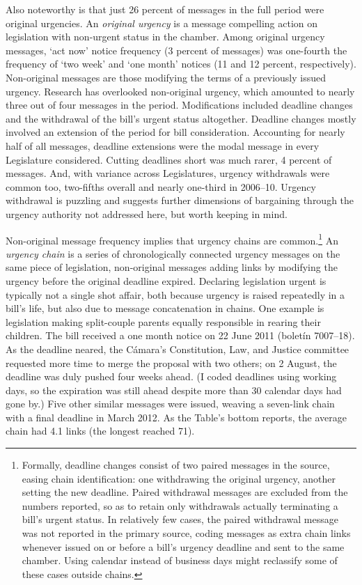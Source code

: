 \documentclass[letter,12pt]{article}
\begin{document}
Also noteworthy is that just 26 percent of messages in the full period were original urgencies. An \emph{original urgency} is a message compelling action on legislation with non-urgent status in the chamber. Among original urgency messages, `act now' notice frequency (3 percent of messages) was one-fourth the frequency of `two week' and `one month' notices (11 and 12 percent, respectively). Non-original messages are those modifying the terms of a previously issued urgency. Research has overlooked non-original urgency, which amounted to nearly three out of four messages in the period. Modifications included deadline changes and the withdrawal of the bill's urgent status altogether. Deadline changes mostly involved an extension of the period for bill consideration. Accounting for nearly half of all messages, deadline extensions were the modal message in every Legislature considered. Cutting deadlines short was much rarer, 4 percent of messages. And, with variance across Legislatures, urgency withdrawals were common too, two-fifths overall and nearly one-third in 2006--10. Urgency withdrawal is puzzling and suggests further dimensions of bargaining through the urgency authority not addressed here, but worth keeping in mind. 

Non-original message frequency implies that urgency chains are common.\footnote{Formally, deadline changes consist of two paired messages in the source, easing chain identification: one withdrawing the original urgency, another setting the new deadline. Paired withdrawal messages are excluded from the numbers reported, so as to retain only withdrawals actually terminating a bill's urgent status. In relatively few cases, the paired withdrawal message was not reported in the primary source, coding messages as extra chain links whenever issued on or before a bill's urgency deadline and sent to the same chamber. Using calendar instead of business days might reclassify some of these cases outside chains.} An \emph{urgency chain} is a series of chronologically connected urgency messages on the same piece of legislation, non-original messages adding links by modifying the urgency before the original deadline expired. Declaring legislation urgent is typically not a single shot affair, both because urgency is raised repeatedly in a bill's life, but also due to message concatenation in chains. One example is legislation making split-couple parents equally responsible in rearing their children. The bill received a one month notice on 22 June 2011 (bolet\'in 7007--18). As the deadline neared, the C\'amara's Constitution, Law, and Justice committee requested more time to merge the proposal with two others; on 2 August, the deadline was duly pushed four weeks ahead. (I coded deadlines using working days, so the expiration was still ahead despite more than 30 calendar days had gone by.) Five other similar messages were issued, weaving a seven-link chain with a final deadline in March 2012. As the Table's bottom reports, the average chain had 4.1 links (the longest reached 71). 
\end{document}
